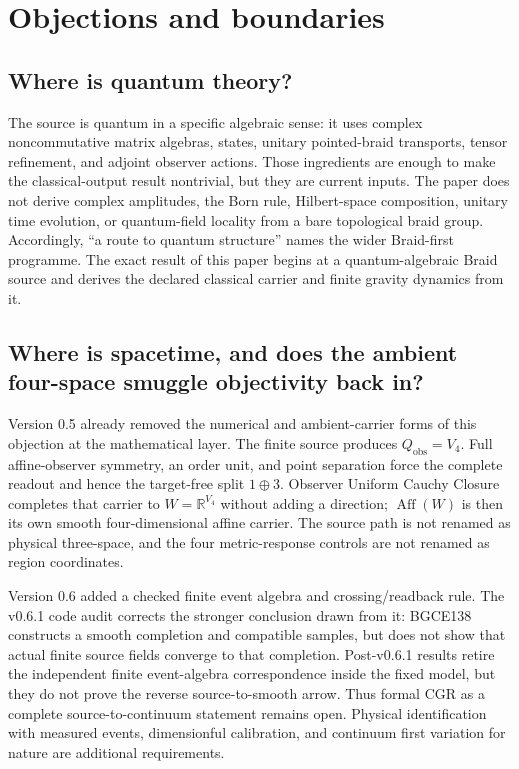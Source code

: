 \section{Objections and boundaries}

\subsection{Where is quantum theory?}

The source is quantum in a specific algebraic sense: it uses complex noncommutative matrix algebras, states, unitary pointed-braid transports, tensor refinement, and adjoint observer actions. Those ingredients are enough to make the classical-output result nontrivial, but they are current inputs. The paper does not derive complex amplitudes, the Born rule, Hilbert-space composition, unitary time evolution, or quantum-field locality from a bare topological braid group. Accordingly, ``a route to quantum structure'' names the wider Braid-first programme. The exact result of this paper begins at a quantum-algebraic Braid source and derives the declared classical carrier and finite gravity dynamics from it.

\subsection{Where is spacetime, and does the ambient four-space smuggle objectivity back in?}

Version 0.5 already removed the numerical and ambient-carrier forms of this objection at the mathematical layer. The finite source produces $Q_{\mathrm{obs}}=V_4$. Full affine-observer symmetry, an order unit, and point separation force the complete readout and hence the target-free split $1\oplus3$. Observer Uniform Cauchy Closure completes that carrier to $W=\mathbb R^{V_4}$ without adding a direction; $\operatorname{Aff}(W)$ is then its own smooth four-dimensional affine carrier. The source path is not renamed as physical three-space, and the four metric-response controls are not renamed as region coordinates.

Version 0.6 added a checked finite event algebra and crossing/readback rule. The v0.6.1 code audit corrects the stronger conclusion drawn from it: BGCE138 constructs a smooth completion and compatible samples, but does not show that actual finite source fields converge to that completion. Post-v0.6.1 results retire the independent finite event-algebra correspondence inside the fixed model, but they do not prove the reverse source-to-smooth arrow. Thus formal CGR as a complete source-to-continuum statement remains open. Physical identification with measured events, dimensionful calibration, and continuum first variation for nature are additional requirements.

